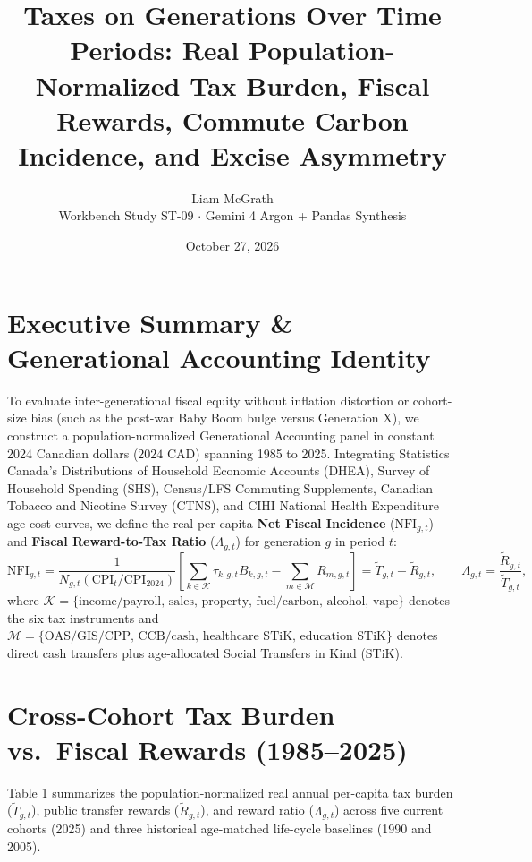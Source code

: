 \documentclass[11pt]{article}
\title{Taxes on Generations Over Time Periods: Real Population-Normalized Tax Burden, Fiscal Rewards, Commute Carbon Incidence, and Excise Asymmetry}
\author{Liam McGrath \\ Workbench Study ST-09 $\cdot$ Gemini 4 Argon + Pandas Synthesis}
\date{October 27, 2026}
\begin{document}
\maketitle
\tableofcontents

\section{Executive Summary \& Generational Accounting Identity}
To evaluate inter-generational fiscal equity without inflation distortion or cohort-size bias (such as the post-war Baby Boom bulge versus Generation X), we construct a population-normalized Generational Accounting panel in constant 2024 Canadian dollars ($\text{2024 CAD}$) spanning 1985 to 2025. Integrating Statistics Canada's Distributions of Household Economic Accounts (DHEA), Survey of Household Spending (SHS), Census/LFS Commuting Supplements, Canadian Tobacco and Nicotine Survey (CTNS), and CIHI National Health Expenditure age-cost curves, we define the real per-capita \textbf{Net Fiscal Incidence} ($\text{NFI}_{g,t}$) and \textbf{Fiscal Reward-to-Tax Ratio} ($\Lambda_{g,t}$) for generation $g$ in period $t$:
\begin{equation}
  \text{NFI}_{g,t} = \frac{1}{N_{g,t}\left(\text{CPI}_t / \text{CPI}_{2024}\right)}\left[\sum_{k \in \mathcal{K}} \tau_{k,g,t} B_{k,g,t} - \sum_{m \in \mathcal{M}} R_{m,g,t}\right] = \tilde{T}_{g,t} - \tilde{R}_{g,t}, \qquad \Lambda_{g,t} = \frac{\tilde{R}_{g,t}}{\tilde{T}_{g,t}},
  \label{eq:gen-accounting}
\end{equation}
where $\mathcal{K} = \{\text{income/payroll, sales, property, fuel/carbon, alcohol, vape}\}$ denotes the six tax instruments and $\mathcal{M} = \{\text{OAS/GIS/CPP, CCB/cash, healthcare STiK, education STiK}\}$ denotes direct cash transfers plus age-allocated Social Transfers in Kind (STiK).

\section{Cross-Cohort Tax Burden vs.\ Fiscal Rewards (1985--2025)}
Table 1 summarizes the population-normalized real annual per-capita tax burden ($\tilde{T}_{g,t}$), public transfer rewards ($\tilde{R}_{g,t}$), and reward ratio ($\Lambda_{g,t}$) across five current cohorts (2025) and three historical age-matched life-cycle baselines (1990 and 2005).
\end{document}
